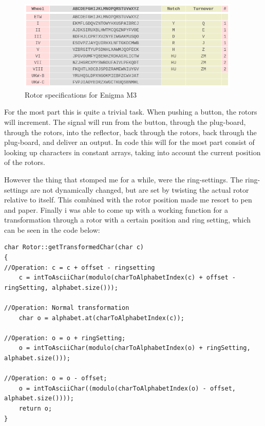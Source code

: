 \documentclass{article}
\begin{document}
\begin{figure}[H]
 \centering
  \includegraphics[width=300pt]{img/enigmaM3specs.png}
 \caption{Rotor specifications for Enigma M3 \cite{ENIGMA2}}
 \end{figure}

For the most part this is quite a trivial task. When pushing a button, the rotors will increment. The signal will run from the button, through the plug-board, through the rotors, into the reflector, back through the rotors, back through the plug-board, and deliver an output. In code this will for the most part consist of looking up characters in constant arrays, taking into account the current position of the rotors. 

However the thing that stomped me for a while, were the ring-settings. The ring-settings are not dynamically changed, but are set by twisting the actual rotor relative to itself. This combined with the rotor position made me resort to pen and paper. Finally i was able to come up with a working function for a transformation through a rotor with a certain position and ring setting, which can be seen in the code below:

\begin{lstlisting}
char Rotor::getTransformedChar(char c)
{
//Operation: c = c + offset - ringsetting
	c = intToAsciiChar(modulo(charToAlphabetIndex(c) + offset - ringSetting, alphabet.size()));

//Operation: Normal transformation
	char o = alphabet.at(charToAlphabetIndex(c));

//Operation: o = o + ringSetting;
	o = intToAsciiChar(modulo(charToAlphabetIndex(o) + ringSetting, alphabet.size()));

//Operation: o = o - offset;
	o = intToAsciiChar((modulo(charToAlphabetIndex(o) - offset, alphabet.size())));
	return o;
}
\end{lstlisting}
\end{document}
